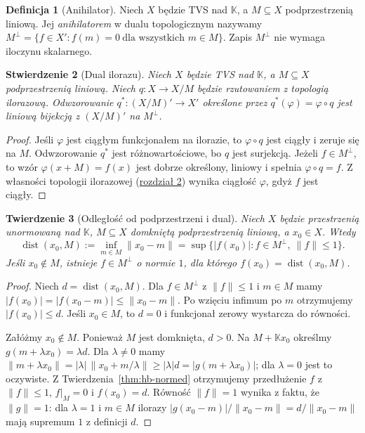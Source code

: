 \documentclass[11pt,a4paper]{article}
\numberwithin{equation}{section}
\theoremstyle{plain}
\newtheorem{twierdzenie}{Twierdzenie}[section]
\newtheorem{stwierdzenie}[twierdzenie]{Stwierdzenie}
\theoremstyle{definition}
\newtheorem{definicja}[twierdzenie]{Definicja}
\theoremstyle{remark}
\newcommand{\K}{\mathbb K}
\begin{document}
\begin{definicja}[Anihilator]\label{def:annihilator}
Niech $X$ będzie TVS nad $\K$, a $M\subseteq X$
podprzestrzenią liniową. Jej \emph{anihilatorem}
w dualu topologicznym nazywamy
$M^\perp=\{f\in X':f(m)=0\ \text{dla wszystkich }m\in M\}$.
Zapis $M^\perp$ nie wymaga iloczynu skalarnego.
\end{definicja}

\begin{stwierdzenie}[Dual ilorazu]\label{prop:quotient-dual}
Niech $X$ będzie TVS nad $\K$, a $M\subseteq X$
podprzestrzenią liniową. Niech $q:X\to X/M$
będzie rzutowaniem z topologią ilorazową.
Odwzorowanie $q^*:(X/M)'\to X'$ określone przez
$q^*(\varphi)=\varphi\circ q$ jest liniową bijekcją
z $(X/M)'$ na $M^\perp$.
\end{stwierdzenie}
\begin{proof}
Jeśli $\varphi$ jest ciągłym funkcjonałem na ilorazie,
to $\varphi\circ q$ jest ciągły i zeruje się na $M$.
Odwzorowanie $q^*$ jest różnowartościowe, bo $q$
jest surjekcją. Jeżeli $f\in M^\perp$, to wzór
$\varphi(x+M)=f(x)$ jest dobrze określony, liniowy
i spełnia $\varphi\circ q=f$.
Z własności topologii ilorazowej (\hyperref[sec:konstrukcje]{rozdział 2})
wynika ciągłość $\varphi$, gdyż $f$ jest ciągły.
\end{proof}

\begin{twierdzenie}[Odległość od podprzestrzeni i dual]\label{thm:distance-dual}
Niech $X$ będzie przestrzenią unormowaną nad $\K$,
$M\subseteq X$ domkniętą podprzestrzenią liniową,
a $x_0\in X$. Wtedy
\[
 \operatorname{dist}(x_0,M):=\inf_{m\in M}\|x_0-m\|
 =\sup\{|f(x_0)|:f\in M^\perp,\ \|f\|\le1\}.
\]
Jeśli $x_0\notin M$, istnieje $f\in M^\perp$
o normie $1$, dla którego $f(x_0)=\operatorname{dist}(x_0,M)$.
\end{twierdzenie}
\begin{proof}
Niech $d=\operatorname{dist}(x_0,M)$.
Dla $f\in M^\perp$ z $\|f\|\le1$ i $m\in M$
mamy $|f(x_0)|=|f(x_0-m)|\le\|x_0-m\|$.
Po wzięciu infimum po $m$ otrzymujemy $|f(x_0)|\le d$.
Jeśli $x_0\in M$, to $d=0$ i funkcjonał zerowy
wystarcza do równości.

Załóżmy $x_0\notin M$. Ponieważ $M$ jest domknięta,
$d>0$. Na $M+\K x_0$ określmy
$g(m+\lambda x_0)=\lambda d$.
Dla $\lambda\ne0$ mamy
$\|m+\lambda x_0\|=|\lambda|\,
\|x_0+m/\lambda\|\ge|\lambda|d=|g(m+\lambda x_0)|$;
dla $\lambda=0$ jest to oczywiste.
Z Twierdzenia~\ref{thm:hb-normed} otrzymujemy
przedłużenie $f$ z $\|f\|\le1$, $f|_M=0$ i
$f(x_0)=d$. Równość $\|f\|=1$ wynika z faktu, że
$\|g\|=1$: dla $\lambda=1$ i $m\in M$ ilorazy
$|g(x_0-m)|/\|x_0-m\|=d/\|x_0-m\|$
mają supremum $1$ z definicji $d$.
\end{proof}
\end{document}
